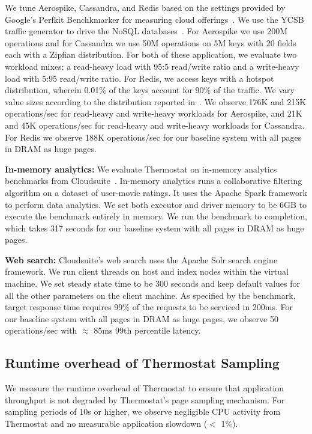 We tune Aerospike, Cassandra, and Redis based on the settings provided by
Google's Perfkit Benchkmarker for measuring cloud
offerings~\cite{perfkitbenchmarker}.  We use the YCSB traffic generator to drive
the NoSQL databases~\cite{ycsb}. For Aerospike we use 200M operations
and for Cassandra we use 50M operations on 5M keys with 20 fields each with a
Zipfian distribution.
For both of these application, we evaluate two workload mixes: a read-heavy load
with 95:5 read/write ratio and a write-heavy load with 5:95 read/write ratio. For Redis, we
access keys with a hotspot distribution, wherein 0.01\% of the keys account for
90\% of the traffic. We vary value sizes according to the
distribution reported in~\cite{facebook-key-value}. We observe 176K
and 215K operations/sec for read-heavy and write-heavy workloads for Aerospike,
and 21K and 45K operations/sec for read-heavy and write-heavy workloads for
Cassandra. For Redis we observe 188K
operations/sec for our baseline system with all pages in
DRAM as huge pages.

{\bf In-memory analytics:} We evaluate Thermostat on in-memory analytics
benchmarks from Cloudsuite~\cite{cloudsuite}. In-memory analytics runs a
collaborative filtering algorithm on a dataset of user-movie ratings.  It uses
the Apache Spark framework to perform data analytics. We set both executor and driver
memory to be 6GB to execute the benchmark entirely in memory. We run the benchmark to
completion, which takes 317 seconds for our baseline system with all pages in
DRAM as huge pages.

{\bf Web search:} Cloudsuite's web search uses the Apache Solr search engine
framework. We run client threads on host and index nodes within the virtual
machine. We set steady state time to be 300 seconds and keep default values for all
the other parameters on the client machine. As specified by the benchmark,
target response time requires 99\% of the requests to be serviced in 200ms. For
our baseline system with all pages in DRAM as huge pages, we observe 50
operations/sec with $\approx$ 85ms 99th percentile latency.

\subsection{Runtime overhead of Thermostat Sampling}
We measure the runtime overhead of Thermostat to ensure that application 
throughput is not degraded by Thermostat's page sampling mechanism.
For sampling periods of 10s or higher, we observe negligible CPU activity
from Thermostat and no measurable application slowdown ($<$ 1\%).


